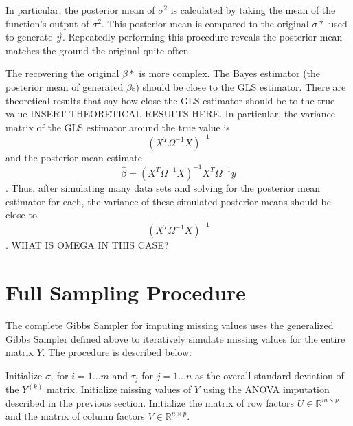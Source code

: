 \documentclass[12pt,twoside]{dukestatscithesis}
\theoremstyle{definition}
\theoremstyle{definition}
\theoremstyle{definition}
\theoremstyle{remark}
\begin{document}
In particular, the posterior mean of \(\sigma^2\) is calculated by
taking the mean of the function's output of \(\sigma^2\). This posterior
mean is compared to the original \(\sigma *\) used to generate
\(\vec{y}\). Repeatedly performing this procedure reveals the posterior
mean matches the ground the original quite often.

The recovering the original \(\beta *\) is more complex. The Bayes
estimator (the posterior mean of generated \(\beta\)s) should be close
to the GLS estimator. There are theoretical results that say how close
the GLS estimator should be to the true value INSERT THEORETICAL RESULTS
HERE. In particular, the variance matrix of the GLS estimator around the
true value is \[(X^T \Omega^{-1} X )^{-1}\] and the posterior mean
estimate \[\hat{\beta} = (X^T \Omega^{-1} X )^{-1}X^T\Omega^{-1}y\].
Thus, after simulating many data sets and solving for the posterior mean
estimator for each, the variance of these simulated posterior means
should be close to \[(X^T \Omega^{-1} X )^{-1}\]. WHAT IS OMEGA IN THIS
CASE?

\section{Full Sampling Procedure}\label{full-sampling-procedure}

The complete Gibbs Sampler for imputing missing values uses the
generalized Gibbs Sampler defined above to iteratively simulate missing
values for the entire matrix \(Y\). The procedure is described below:

Initialize \(\sigma_i\) for \(i = 1 ... m\) and \(\tau_j\) for
\(j = 1 ... n\) as the overall standard deviation of the \(Y^{(k)}\)
matrix. Initialize missing values of \(Y\) using the ANOVA imputation
described in the previous section. Initialize the matrix of row factors
\(U \in \mathbb{R}^{m \times p}\) and the matrix of column factors
\(V \in \mathbb{R}^{n \times p}\).
\end{document}
